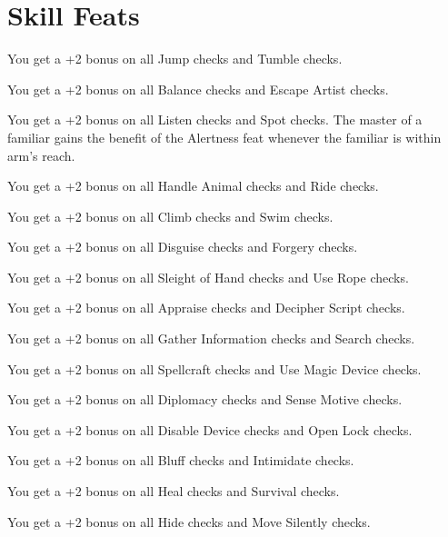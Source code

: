 \section{Skill Feats}

{You get a +2 bonus on all Jump checks and Tumble checks.}

{You get a +2 bonus on all Balance checks and Escape Artist checks.}

{You get a +2 bonus on all Listen checks and Spot checks.}
{}
{The master of a familiar gains the benefit of the Alertness feat whenever the familiar is within arm’s reach.}

{You get a +2 bonus on all Handle Animal checks and Ride checks.}

{You get a +2 bonus on all Climb checks and Swim checks.}

{You get a +2 bonus on all Disguise checks and Forgery checks.}

{You get a +2 bonus on all Sleight of Hand checks and Use Rope checks.}

{You get a +2 bonus on all Appraise checks and Decipher Script checks.}

{You get a +2 bonus on all Gather Information checks and Search checks.}

{You get a +2 bonus on all Spellcraft checks and Use Magic Device checks.}

{You get a +2 bonus on all Diplomacy checks and Sense Motive checks.}

{You get a +2 bonus on all Disable Device checks and Open Lock checks.}

{You get a +2 bonus on all Bluff checks and Intimidate checks.}

{You get a +2 bonus on all Heal checks and Survival checks.}

{You get a +2 bonus on all Hide checks and Move Silently checks.}